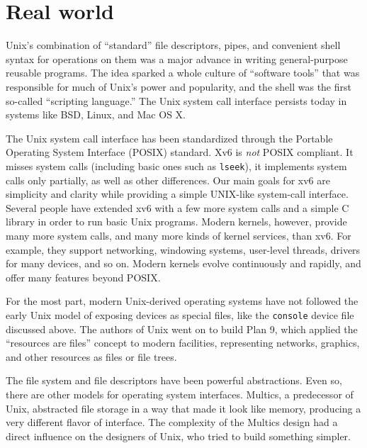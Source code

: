 \section{Real world}

Unix's combination of ``standard'' file
descriptors, pipes, and convenient shell syntax for
operations on them was a major advance in writing
general-purpose reusable programs.
The idea sparked a whole culture of ``software tools'' that was
responsible for much of Unix's power and popularity,
and the shell was the first so-called ``scripting language.''
The Unix system call interface persists today in systems like
BSD, Linux, and Mac OS X.

The Unix system call interface has been standardized through the Portable
Operating System Interface (POSIX) standard.
Xv6 is
\textit{not}
POSIX compliant.  It misses system calls (including basic ones such as
\lstinline{lseek}),
it implements system calls only partially, as well as other differences.  Our main goals for xv6 are
simplicity and clarity while providing a simple UNIX-like system-call interface.
Several people have extended xv6 with a few more system calls and a simple
C library in order to run basic Unix programs.  Modern kernels, however,
provide many more system calls, and many more kinds of kernel services, than
xv6.  For example, they support networking, windowing systems, user-level threads,
drivers for many devices, and so on.  Modern kernels evolve continuously and
rapidly, and offer many features beyond POSIX.

For the most part, modern Unix-derived operating systems
have not followed the early
Unix model of exposing devices as special files, like the
\lstinline{console}
device file discussed above.
The authors of Unix went on to build Plan 9,
which applied the ``resources are files''
concept to modern facilities,
representing networks, graphics, and other resources
as files or file trees.

The file system and file descriptors have been  powerful
abstractions.
Even so, there are other models for operating system interfaces.
Multics, a predecessor of Unix,
abstracted file storage in a way that made it look like memory,
producing a very different flavor of interface.
The complexity of the Multics design had a direct influence
on the designers of Unix, who tried to build something simpler.

